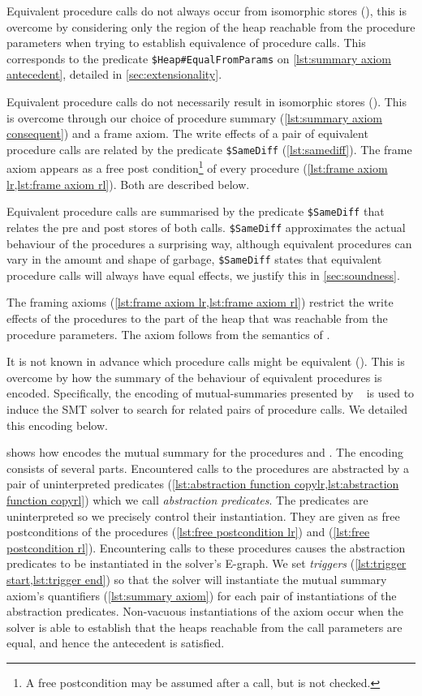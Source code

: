 \documentclass[runningheads,a4paper]{llncs}
\begin{document}
Equivalent procedure calls do not always occur from isomorphic stores (\textbf{\ctwo{}}), this is overcome by considering only the region of the heap reachable from the procedure parameters when trying to establish equivalence of procedure calls. This corresponds to the predicate \texttt{\$Heap\#EqualFromParams} on \cref{lst:summary axiom antecedent}, detailed in \cref{sec:extensionality}.

Equivalent procedure calls do not necessarily result in isomorphic stores (\textbf{\cthree}). This is overcome through our choice of procedure summary (\cref{lst:summary axiom consequent}) and a frame axiom. The write effects of a pair of equivalent procedure calls are related by the predicate \texttt{\$SameDiff} (\cref{lst:samediff}). The frame axiom appears as a free post condition\footnote{A free postcondition may be assumed after a call, but is not checked.} of every procedure (\cref{lst:frame axiom lr,lst:frame axiom rl}).  Both are described below.

Equivalent procedure calls are summarised by the predicate \texttt{\$SameDiff} that relates the pre and post stores of both calls. \texttt{\$SameDiff} approximates the actual behaviour of the procedures a surprising way, although equivalent procedures can vary in the amount and shape of garbage, \texttt{\$SameDiff} states that equivalent procedure calls will always have equal effects, we justify this in \cref{sec:soundness}.

The framing axioms (\cref{lst:frame axiom lr,lst:frame axiom rl}) restrict the write effects of the procedures to the part of the heap that was reachable from the procedure parameters. The axiom follows from the semantics of \lang{}.

It is not known in advance which procedure calls might be equivalent (\textbf{\cfour{}}). This is overcome by how the summary of the behaviour of equivalent procedures is encoded. Specifically, the encoding of mutual-summaries presented by \citeauthor{Hawblitzel2013}~\cite{Hawblitzel2013} is used to induce the SMT solver to search for related pairs of procedure calls. We detailed this encoding below.

 shows how \tool{} encodes the mutual summary for the procedures \copylr{} and \copyrl{}. The encoding consists of several parts. Encountered calls to the procedures are abstracted by a pair of uninterpreted predicates (\cref{lst:abstraction function copylr,lst:abstraction function copyrl}) which we call \emph{abstraction predicates}. The predicates are uninterpreted so we precisely control their instantiation. They are given as free postconditions of the procedures \copylr{} (\cref{lst:free postcondition lr}) and \copyrl{} (\cref{lst:free postcondition rl}). Encountering calls to these procedures causes the abstraction predicates to be instantiated in the solver's E-graph. We set \emph{triggers} (\cref{lst:trigger start,lst:trigger end}) so that the solver will instantiate the mutual summary axiom's quantifiers (\cref{lst:summary axiom}) for each pair of instantiations of the abstraction predicates. Non-vacuous instantiations of the axiom occur when the solver is able to establish that the heaps reachable from the call parameters are equal, and hence the antecedent is satisfied.
\end{document}
